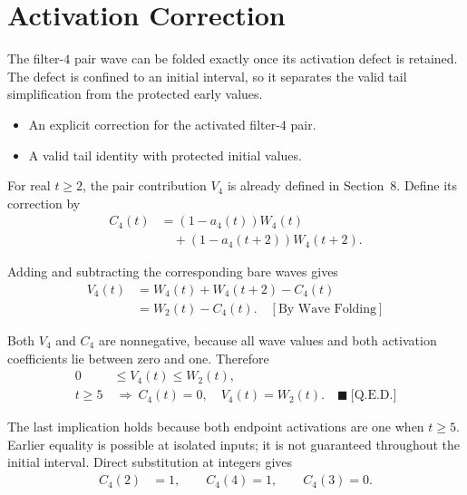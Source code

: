 \section{Activation Correction}
The filter-$4$ pair wave can be folded exactly once its activation defect is
retained. The defect is confined to an initial interval, so it separates the
valid tail simplification from the protected early values.

\begin{itemize}
\item An explicit correction for the activated filter-$4$ pair.
\item A valid tail identity with protected initial values.
\end{itemize}

For real $t\ge2$, the pair contribution $V_4$ is already defined in Section~8.
Define its correction by
\begin{equation*}
\begin{aligned}
C_4(t)&=(1-a_4(t))W_4(t)\\
&\quad +(1-a_4(t+2))W_4(t+2).
\end{aligned}
\end{equation*}

Adding and subtracting the corresponding bare waves gives
\begin{equation*}
\begin{aligned}
V_4(t)
&=W_4(t)+W_4(t+2)-C_4(t)\\
&=W_2(t)-C_4(t).
\quad[\text{By Wave Folding}]
\end{aligned}
\end{equation*}

Both $V_4$ and $C_4$ are nonnegative, because all wave values and both
activation coefficients lie between zero and one. Therefore
\begin{equation*}
\begin{aligned}
0&\le V_4(t)\le W_2(t),\\
t\ge5&\ \Longrightarrow\ C_4(t)=0,\quad V_4(t)=W_2(t).
\quad\blacksquare\ \text{[Q.E.D.]}
\end{aligned}
\end{equation*}

The last implication holds because both endpoint activations are one when
$t\ge5$. Earlier equality is possible at isolated inputs; it is not guaranteed
throughout the initial interval. Direct substitution at integers gives
\begin{equation*}
\begin{aligned}
C_4(2)&=1,\qquad C_4(4)=1,\qquad C_4(3)=0.
\end{aligned}
\end{equation*}


